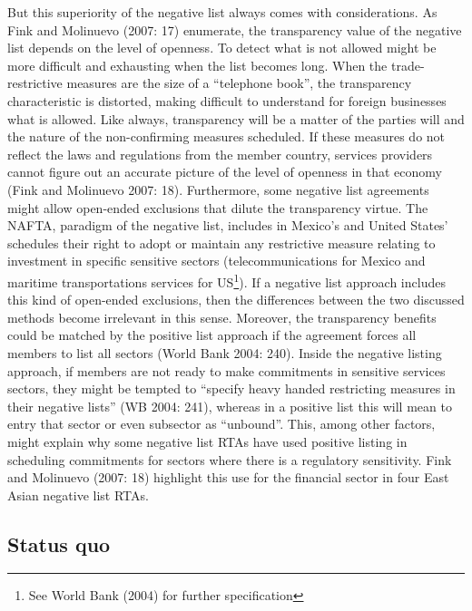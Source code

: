 \documentclass{article}
\begin{document}
\smallskip

But this superiority of the negative list always comes with considerations. As Fink and Molinuevo (2007: 17) enumerate, the transparency value of the negative list depends on the level of openness. To detect what is not allowed might be more difficult and exhausting when the list becomes long. When the trade-restrictive measures are the size of a “telephone book”, the transparency characteristic is distorted, making difficult to understand for foreign businesses what is allowed. Like always, transparency will be a matter of the parties will and the nature of the non-confirming measures scheduled. If these measures do not reflect the laws and regulations from the member country, services providers cannot figure out an accurate picture of the level of openness in that economy (Fink and Molinuevo 2007: 18). Furthermore, some negative list agreements might allow open-ended exclusions that dilute the transparency virtue. The NAFTA, paradigm of the negative list, includes in Mexico’s and United States’ schedules their right to adopt or maintain any restrictive measure relating to investment in specific sensitive sectors (telecommunications for Mexico and maritime transportations services for US\footnote{See World Bank (2004) for further specification}). If a negative list approach includes this kind of open-ended exclusions, then the differences between the two discussed methods become irrelevant in this sense. Moreover, the transparency benefits could be matched by the positive list approach if the agreement forces all members to list all sectors (World Bank 2004: 240). Inside the negative listing approach, if members are not ready to make commitments in sensitive services sectors, they might be tempted to “specify heavy handed restricting measures in their negative lists” (WB 2004: 241), whereas in a positive list this will mean to entry that sector or even subsector as “unbound”. This, among other factors, might explain why some negative list RTAs have used positive listing in scheduling commitments for sectors where there is a regulatory sensitivity. Fink and Molinuevo (2007: 18) highlight this use for the financial sector in four East Asian negative list RTAs.

\subsection{Status quo}
\end{document}
